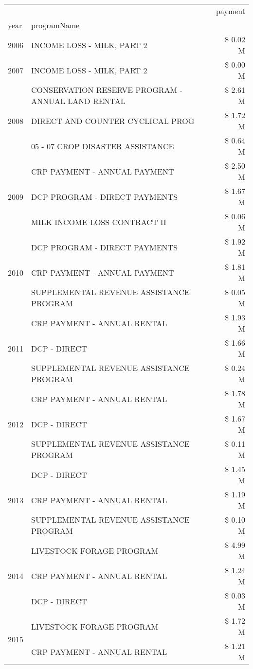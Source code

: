 \begin{tabular}{llr}
\toprule
 &  & payment \\
year & programName &  \\
\midrule
2006 & INCOME LOSS - MILK, PART 2 & \$ 0.02 M \\
\cline{1-3}
2007 & INCOME LOSS - MILK, PART 2 & \$ 0.00 M \\
\cline{1-3}
\multirow[t]{3}{*}{2008} & CONSERVATION RESERVE PROGRAM - ANNUAL LAND RENTAL & \$ 2.61 M \\
 & DIRECT AND COUNTER CYCLICAL PROG & \$ 1.72 M \\
 & 05 - 07 CROP DISASTER ASSISTANCE & \$ 0.64 M \\
\cline{1-3}
\multirow[t]{3}{*}{2009} & CRP PAYMENT - ANNUAL PAYMENT & \$ 2.50 M \\
 & DCP PROGRAM - DIRECT PAYMENTS & \$ 1.67 M \\
 & MILK INCOME LOSS CONTRACT II & \$ 0.06 M \\
\cline{1-3}
\multirow[t]{3}{*}{2010} & DCP PROGRAM - DIRECT PAYMENTS & \$ 1.92 M \\
 & CRP PAYMENT - ANNUAL PAYMENT & \$ 1.81 M \\
 & SUPPLEMENTAL REVENUE ASSISTANCE PROGRAM & \$ 0.05 M \\
\cline{1-3}
\multirow[t]{3}{*}{2011} & CRP PAYMENT - ANNUAL RENTAL & \$ 1.93 M \\
 & DCP - DIRECT & \$ 1.66 M \\
 & SUPPLEMENTAL REVENUE ASSISTANCE PROGRAM & \$ 0.24 M \\
\cline{1-3}
\multirow[t]{3}{*}{2012} & CRP PAYMENT - ANNUAL RENTAL & \$ 1.78 M \\
 & DCP - DIRECT & \$ 1.67 M \\
 & SUPPLEMENTAL REVENUE ASSISTANCE PROGRAM & \$ 0.11 M \\
\cline{1-3}
\multirow[t]{3}{*}{2013} & DCP - DIRECT & \$ 1.45 M \\
 & CRP PAYMENT - ANNUAL RENTAL & \$ 1.19 M \\
 & SUPPLEMENTAL REVENUE ASSISTANCE PROGRAM & \$ 0.10 M \\
\cline{1-3}
\multirow[t]{3}{*}{2014} & LIVESTOCK FORAGE PROGRAM & \$ 4.99 M \\
 & CRP PAYMENT - ANNUAL RENTAL & \$ 1.24 M \\
 & DCP - DIRECT & \$ 0.03 M \\
\cline{1-3}
\multirow[t]{3}{*}{2015} & LIVESTOCK FORAGE PROGRAM & \$ 1.72 M \\
 & CRP PAYMENT - ANNUAL RENTAL & \$ 1.21 M \\

\end{tabular}
